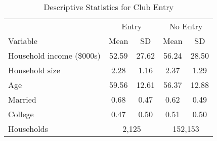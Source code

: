 \begin{table}[!htbp] \centering
\caption{Descriptive Statistics for Club Entry}
\label{tab:costcoSummaryStats}
\begin{tabular}{@{\extracolsep{4pt}}lcccc}
\hline
 & \multicolumn{2}{c}{Entry} & \multicolumn{2}{c}{No Entry}  \\
\cline{2-3} \cline{4-5}
Variable                  & Mean  & SD    & Mean  & SD   \\
\hline
Household income (\$000s) & 52.59 & 27.62 & 56.24 & 28.50 \\
Household size            & 2.28  & 1.16  & 2.37  & 1.29   \\
Age                       & 59.56 & 12.61 & 56.37 & 12.88  \\
Married                   & 0.68  & 0.47  & 0.62  & 0.49   \\
College                   & 0.47  & 0.50  & 0.51  & 0.50   \\
\hline
Households  & \multicolumn{2}{c}{2,125} & \multicolumn{2}{c}{152,153}  \\
\hline
\hline
\end{tabular}
\end{table}
